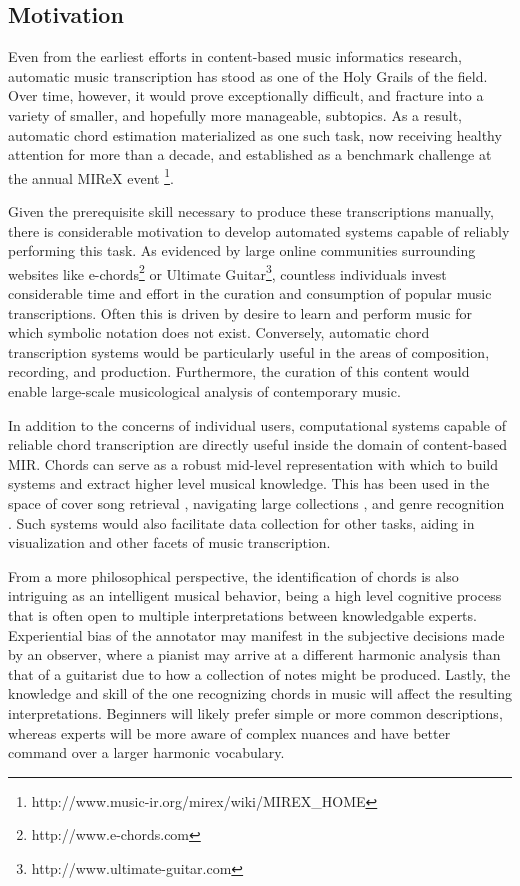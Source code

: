 \subsection{Motivation}
\label{sec:motivation}

Even from the earliest efforts in content-based music informatics research, automatic music transcription has stood as one of the Holy Grails of the field.
Over time, however, it would prove exceptionally difficult, and fracture into a variety of smaller, and hopefully more manageable, subtopics.
As a result, automatic chord estimation materialized as one such task, now receiving healthy attention for more than a decade, and established as a benchmark challenge at the annual MIReX event \footnote{{http://www.music-ir.org/mirex/wiki/MIREX\_HOME}}.

Given the prerequisite skill necessary to produce these transcriptions manually, there is considerable motivation to develop automated systems capable of reliably performing this task.
As evidenced by large online communities surrounding websites like e-chords\footnote{http://www.e-chords.com} or Ultimate Guitar\footnote{http://www.ultimate-guitar.com}, countless individuals invest considerable time and effort in the curation and consumption of popular music transcriptions.
Often this is driven by desire to learn and perform music for which symbolic notation does not exist.
Conversely, automatic chord transcription systems would be particularly useful in the areas of composition, recording, and production.
Furthermore, the curation of this content would enable large-scale musicological analysis of contemporary music.

In addition to the concerns of individual users, computational systems capable of reliable chord transcription are directly useful inside the domain of content-based MIR.
Chords can serve as a robust mid-level representation with which to build systems and extract higher level musical knowledge.
This has been used in the space of cover song retrieval \cite{Juan?}, navigating large collections \cite{alan?}, and genre recognition \cite{anglade}.
Such systems would also facilitate data collection for other tasks, aiding in visualization and other facets of music transcription.

From a more philosophical perspective, the identification of chords is also intriguing as an intelligent musical behavior, being a high level cognitive process that is often open to multiple interpretations between knowledgable experts.
Experiential bias of the annotator may manifest in the subjective decisions made by an observer, where a pianist may arrive at a different harmonic analysis than that of a guitarist due to how a collection of notes might be produced.
Lastly, the knowledge and skill of the one recognizing chords in music will affect the resulting interpretations.
Beginners will likely prefer simple or more common descriptions, whereas experts will be more aware of complex nuances and have better command over a larger harmonic vocabulary.


